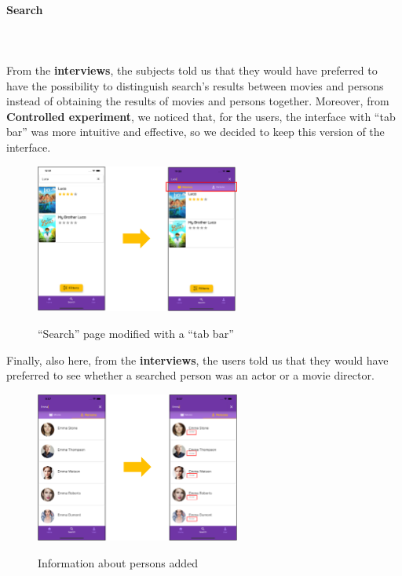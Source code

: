 \documentclass[12pt, a4paper]{article}
\numberwithin{figure}{section}
\begin{document}
\paragraph{Search}\mbox{}\\\\
From the \textbf{interviews}, the subjects told us that they would have preferred to have the possibility
to distinguish search's results between movies and persons instead of obtaining the results of movies and 
persons together. Moreover, from \textbf{Controlled experiment}, we noticed that, for the users, 
the interface with “tab bar” was more intuitive and effective, so we decided to keep this version
of the interface.
\begin{center}
	\begin{figure}[H]
		\centering
		\includegraphics[width=0.6\textwidth]{images/prototype2/search.png}\\
		\caption{“Search” page modified with a “tab bar”}
	\end{figure}
\end{center}
\vspace*{-0.5cm}
\noindent
Finally, also here, from the \textbf{interviews}, the users told us that they would have preferred 
to see whether a searched person was an actor or a movie director.
\begin{center}
	\begin{figure}[H]
		\centering
		\includegraphics[width=0.6\textwidth]{images/prototype2/searchPerson.png}\\
		\caption{Information about persons added}
	\end{figure}
\end{center}
\end{document}
